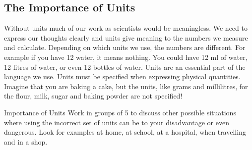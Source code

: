\subsection*{The Importance of Units}
            \nopagebreak
Without units much of our work as scientists would be meaningless. We need to express our thoughts clearly and units give meaning to the numbers we measure and calculate. Depending on which units we use, the numbers are different. For example if you have 12 water, it means nothing. You could have 12 ml of water, 12 litres of water, or even 12 bottles of water. Units are an essential part of the language we use. Units must be specified when expressing physical quantities. Imagine that you are baking a cake, but the units, like grams and millilitres, for the flour, milk, sugar and baking powder are not specified!
\begin{groupdiscussion}{Importance of Units }
            \nopagebreak
Work in groups of 5 to discuss other possible situations where using the incorrect set of units can be to your disadvantage or even dangerous. Look for examples at home, at school, at a hospital, when travelling and in a shop. 
\end{groupdiscussion}
